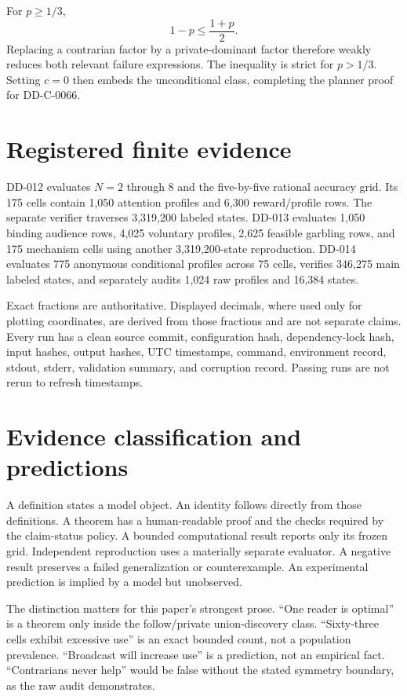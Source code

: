 \documentclass[11pt]{article}
\begin{document}
For $p\geq1/3$,
\[
 1-p\leq\frac{1+p}{2}.
\]
Replacing a contrarian factor by a private-dominant factor therefore weakly
reduces both relevant failure expressions. The inequality is strict for
$p>1/3$. Setting $c=0$ then embeds the unconditional class, completing the
planner proof for DD-C-0066.

\section{Registered finite evidence}

DD-012 evaluates $N=2$ through 8 and the five-by-five rational accuracy grid.
Its 175 cells contain 1,050 attention profiles and 6,300 reward/profile rows.
The separate verifier traverses 3,319,200 labeled states. DD-013 evaluates 1,050
binding audience rows, 4,025 voluntary profiles, 2,625 feasible garbling rows,
and 175 mechanism cells using another 3,319,200-state reproduction. DD-014
evaluates 775 anonymous conditional profiles across 75 cells, verifies 346,275
main labeled states, and separately audits 1,024 raw profiles and 16,384 states.

Exact fractions are authoritative. Displayed decimals, where used only for
plotting coordinates, are derived from those fractions and are not separate
claims. Every run has a clean source commit, configuration hash, dependency-lock
hash, input hashes, output hashes, UTC timestamps, command, environment record,
stdout, stderr, validation summary, and corruption record. Passing runs are not
rerun to refresh timestamps.

\section{Evidence classification and predictions}

A definition states a model object. An identity follows directly from those
definitions. A theorem has a human-readable proof and the checks required by
the claim-status policy. A bounded computational result reports only its frozen
grid. Independent reproduction uses a materially separate evaluator. A negative
result preserves a failed generalization or counterexample. An experimental
prediction is implied by a model but unobserved.

The distinction matters for this paper's strongest prose. ``One reader is
optimal'' is a theorem only inside the follow/private union-discovery class.
``Sixty-three cells exhibit excessive use'' is an exact bounded count, not a
population prevalence. ``Broadcast will increase use'' is a prediction, not an
empirical fact. ``Contrarians never help'' would be false without the stated
symmetry boundary, as the raw audit demonstrates.
\end{document}
